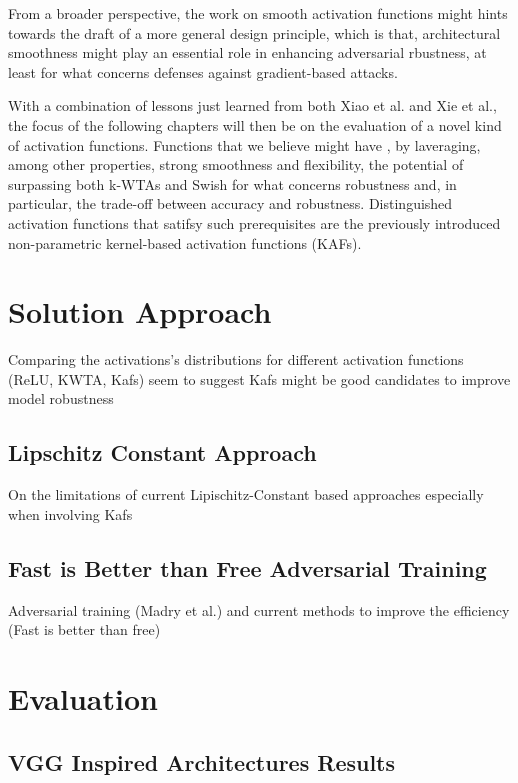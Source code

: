 \documentclass[LaM,binding=0.6cm]{./packages/sapthesis/sapthesis}
\begin{document}
    From a broader perspective, the work on smooth activation functions might
    hints towards the draft of a more general design principle, which is that,
    architectural smoothness might play an essential role in enhancing 
    adversarial rbustness, at least for what concerns defenses against 
    gradient-based attacks.

    With a combination of lessons just learned from both Xiao et al. and
    Xie et al., the focus of the following chapters will then be on the evaluation
    of a novel kind of activation functions. Functions that we believe might have 
    , by laveraging, among other properties, strong smoothness
    and flexibility, the potential of surpassing both k-WTAs and Swish 
    for what concerns robustness and, in particular, the trade-off
    between accuracy and robustness. Distinguished activation functions that 
    satifsy such prerequisites are the previously introduced non-parametric 
    kernel-based activation functions (KAFs). 



\chapter{Solution Approach}
 
    Comparing the activations's distributions for different activation functions (ReLU, KWTA, Kafs) 
    seem to suggest Kafs might be good candidates to improve model robustness 

    \section{Lipschitz Constant Approach}

        On the limitations of current Lipischitz-Constant based approaches especially when involving Kafs

    \section{Fast is Better than Free Adversarial Training}

        Adversarial training (Madry et al.) and current methods to improve the efficiency (Fast is better than free)


\chapter{Evaluation}

    \section{VGG Inspired Architectures Results}
\end{document}
